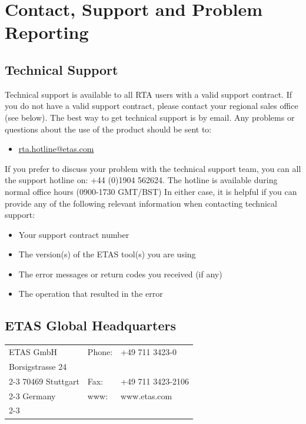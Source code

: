 \chapter{Contact, Support and Problem Reporting}

\section{Technical Support}
Technical support is available to all RTA users with a valid support contract. If you do not have a valid support contract, please contact your regional sales office (see below).
\vfill
The best way to get technical support is by email. Any problems or questions about the use of the product should be sent to: 
\begin{itemize}
	\item \href{rta.hotline@etas.com}{rta.hotline@etas.com}	
\end{itemize}    

If you prefer to discuss your problem with the technical support team, you can all the support hotline on: 
\vfill
 +44 (0)1904 562624. 
\vfill
The hotline is available during normal office hours (0900-1730 GMT/BST)
\vfill
In either case, it is helpful if you can provide any of the following relevant information when contacting technical support:
\begin{itemize}
	\item Your support contract number
	\item The version(s) of the ETAS tool(s) you are using
	\item The error messages or return codes you received (if any)
	\item The operation that resulted in the error
\end{itemize}

\section{ETAS Global Headquarters}

\begin{tabular}{| p{4.5cm} | p{5cm} | p{5cm} |}
	\hline
	ETAS GmbH & Phone: & +49 711 3423-0 \\
	Borsigstrasse 24 & & \\ \cline{2-3}
	70469 Stuttgart & Fax: & +49 711 3423-2106 \\ \cline{2-3}
	Germany & www: & www.etas.com \\ \cline{2-3}
	\hline 
\end{tabular}

